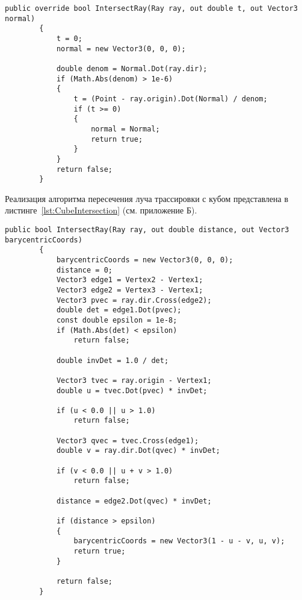 \clearpage
\begin{center}
	\begin{lstlisting}[label={lst:WallIntersection}, captionpos={b}, caption={Алгоритм поиска точки пересечения луча с плоскостью (стеной)}]
		public override bool IntersectRay(Ray ray, out double t, out Vector3 normal)
		{
			t = 0;
			normal = new Vector3(0, 0, 0);
			
			double denom = Normal.Dot(ray.dir);
			if (Math.Abs(denom) > 1e-6)
			{
				t = (Point - ray.origin).Dot(Normal) / denom;
				if (t >= 0)
				{
					normal = Normal;
					return true;
				}
			}
			return false;
		}
	\end{lstlisting}
\end{center}

Реализация алгоритма пересечения луча трассировки с кубом представлена в листинге~\ref{lst:CubeIntersection} (см. приложение Б).

\clearpage
\begin{center}
	\begin{lstlisting}[label={lst:TriangleIntersection}, captionpos={b}, caption={Алгоритм поиска точки пересечения луча с треугольным полигоном}]
		public bool IntersectRay(Ray ray, out double distance, out Vector3 barycentricCoords)
		{
			barycentricCoords = new Vector3(0, 0, 0);
			distance = 0;
			Vector3 edge1 = Vertex2 - Vertex1;
			Vector3 edge2 = Vertex3 - Vertex1;
			Vector3 pvec = ray.dir.Cross(edge2);
			double det = edge1.Dot(pvec);
			const double epsilon = 1e-8;
			if (Math.Abs(det) < epsilon)
				return false;
			
			double invDet = 1.0 / det;
			
			Vector3 tvec = ray.origin - Vertex1;
			double u = tvec.Dot(pvec) * invDet;
			
			if (u < 0.0 || u > 1.0)
				return false;
			
			Vector3 qvec = tvec.Cross(edge1);
			double v = ray.dir.Dot(qvec) * invDet;
			
			if (v < 0.0 || u + v > 1.0)
				return false;
			
			distance = edge2.Dot(qvec) * invDet;
			
			if (distance > epsilon)
			{
				barycentricCoords = new Vector3(1 - u - v, u, v);
				return true;
			}
			
			return false;
		}
	\end{lstlisting}
\end{center}

